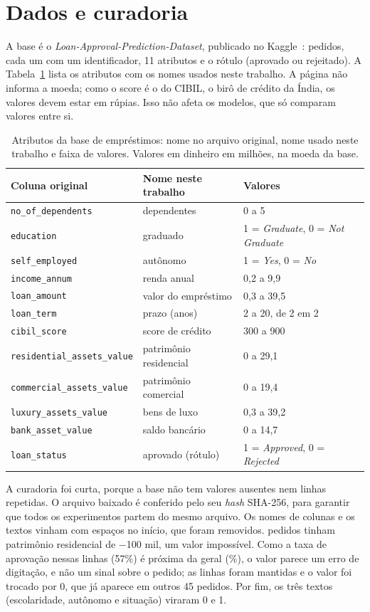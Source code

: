 \section{Dados e curadoria}\label{sec:rn_dados}

A base é o \emph{Loan-Approval-Prediction-Dataset}, publicado no Kaggle~\cite{kaggle:loan}: \rnLinhas{} pedidos, cada um com um identificador, 11 atributos e o rótulo (aprovado ou rejeitado). A Tabela~\ref{tab:rn_atributos} lista os atributos com os nomes usados neste trabalho. A página não informa a moeda; como o score é o do CIBIL, o birô de crédito da Índia, os valores devem estar em rúpias. Isso não afeta os modelos, que só comparam valores entre si.

\begin{table}[ht]
\centering
\caption{Atributos da base de empréstimos: nome no arquivo original, nome usado neste trabalho e faixa de valores. Valores em dinheiro em milhões, na moeda da base.}
\label{tab:rn_atributos}
\footnotesize
\begin{tabular}{lll}
\toprule
Coluna original & Nome neste trabalho & Valores \\
\midrule
\texttt{no\_of\_dependents} & dependentes & 0 a 5 \\
\texttt{education} & graduado & 1 = \emph{Graduate}, 0 = \emph{Not Graduate} \\
\texttt{self\_employed} & autônomo & 1 = \emph{Yes}, 0 = \emph{No} \\
\texttt{income\_annum} & renda anual & 0,2 a 9,9 \\
\texttt{loan\_amount} & valor do empréstimo & 0,3 a 39,5 \\
\texttt{loan\_term} & prazo (anos) & 2 a 20, de 2 em 2 \\
\texttt{cibil\_score} & score de crédito & 300 a 900 \\
\texttt{residential\_assets\_value} & patrimônio residencial & 0 a 29,1 \\
\texttt{commercial\_assets\_value} & patrimônio comercial & 0 a 19,4 \\
\texttt{luxury\_assets\_value} & bens de luxo & 0,3 a 39,2 \\
\texttt{bank\_asset\_value} & saldo bancário & 0 a 14,7 \\
\texttt{loan\_status} & aprovado (rótulo) & 1 = \emph{Approved}, 0 = \emph{Rejected} \\
\bottomrule
\end{tabular}
\end{table}

A curadoria foi curta, porque a base não tem valores ausentes nem linhas repetidas. O arquivo baixado é conferido pelo seu \emph{hash} SHA-256, para garantir que todos os experimentos partem do mesmo arquivo. Os nomes de colunas e os textos vinham com espaços no início, que foram removidos. \rnNegativos{} pedidos tinham patrimônio residencial de $-$100 mil, um valor impossível. Como a taxa de aprovação nessas linhas (57\%) é próxima da geral (\rnAprovados\%), o valor parece um erro de digitação, e não um sinal sobre o pedido; as linhas foram mantidas e o valor foi trocado por 0, que já aparece em outros 45 pedidos. Por fim, os três textos (escolaridade, autônomo e situação) viraram 0 e 1.

